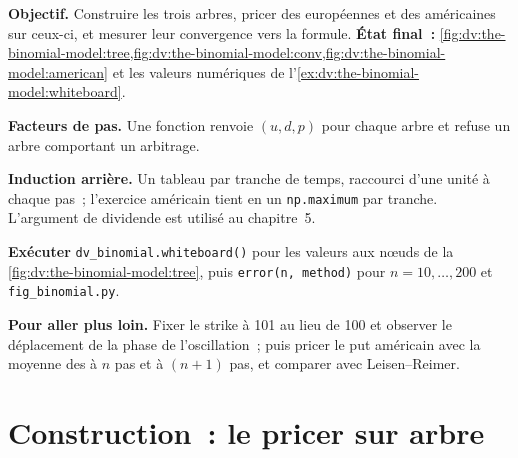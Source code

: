 \begin{tutorial}
\textbf{Objectif.} Construire les trois arbres, pricer des européennes et des américaines sur ceux-ci, et
mesurer leur convergence vers la formule. \textbf{État final~:}
\cref{fig:dv:the-binomial-model:tree,fig:dv:the-binomial-model:conv,fig:dv:the-binomial-model:american}
et les valeurs numériques de l'\cref{ex:dv:the-binomial-model:whiteboard}.
\begin{tutsteps}
\item \textbf{Facteurs de pas.} Une fonction renvoie $(u,d,p)$ pour chaque arbre et
refuse un arbre comportant un arbitrage.
\label{lst:dv:the-binomial-model:params}
\item \textbf{Induction arrière.} Un tableau par tranche de temps, raccourci d'une unité
à chaque pas~; l'exercice américain tient en un \texttt{np.maximum} par tranche. L'argument
de dividende est utilisé au chapitre~5.
\label{lst:dv:the-binomial-model:price}
\item \textbf{Exécuter} \texttt{dv\_binomial.whiteboard()} pour les valeurs aux nœuds de la
\cref{fig:dv:the-binomial-model:tree}, puis \texttt{error(n, method)} pour
$n=10,\dots,200$ et \texttt{fig\_binomial.py}.
\end{tutsteps}
\textbf{Pour aller plus loin.} Fixer le strike à 101 au lieu de 100 et observer
le déplacement de la phase de l'oscillation~; puis pricer le put américain avec la moyenne des
 à $n$ pas et à $(n+1)$ pas, et comparer avec Leisen--Reimer.
\end{tutorial}

\section{Construction~: le pricer sur arbre}\label{bld:dv:the-binomial-model:binomial}

